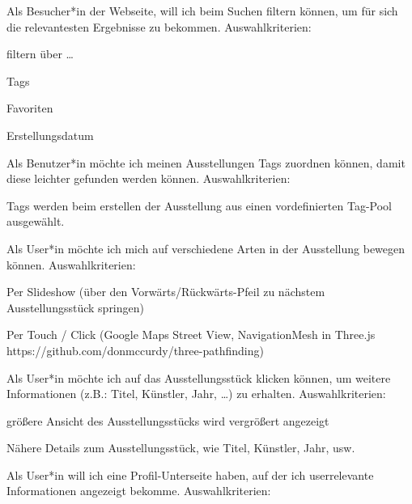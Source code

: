 \begin{compactenum}
    \item  Als Besucher*in der Webseite, will ich beim Suchen filtern können, um für sich die relevantesten Ergebnisse zu bekommen. Auswahlkriterien: 
    \begin{compactitem}
        \item filtern über …
        \begin{compactitem}
            \item Tags
            \item Favoriten
            \item Erstellungsdatum
        \end{compactitem}
    \end{compactitem} 
    \item Als Benutzer*in möchte ich meinen Ausstellungen Tags zuordnen können, damit diese leichter gefunden werden können. Auswahlkriterien: 
    \begin{compactitem}
        \item Tags werden beim erstellen der Ausstellung aus einen vordefinierten Tag-Pool ausgewählt.
    \end{compactitem} 
    \item Als User*in möchte ich mich auf verschiedene Arten in der Ausstellung bewegen können. Auswahlkriterien: 
    \begin{compactitem}
        \item Per Slideshow (über den Vorwärts/Rückwärts-Pfeil zu nächstem Ausstellungsstück springen)
        \item Per Touch / Click (Google Maps Street View, NavigationMesh in Three.js https://github.com/donmccurdy/three-pathfinding)
    \end{compactitem} 
    \item  Als User*in möchte ich auf das Ausstellungsstück klicken können, um weitere Informationen (z.B.: Titel, Künstler, Jahr, …) zu erhalten. Auswahlkriterien: 
    \begin{compactitem}
        \item größere Ansicht des Ausstellungsstücks wird vergrößert angezeigt
        \item Nähere Details zum Ausstellungsstück, wie Titel, Künstler, Jahr, usw.
    \end{compactitem} 
    \item  Als User*in will ich eine Profil-Unterseite haben, auf der ich userrelevante Informationen angezeigt bekomme. Auswahlkriterien: 
    \begin{compactitem}

\end{compactitem}
\end{compactenum}
